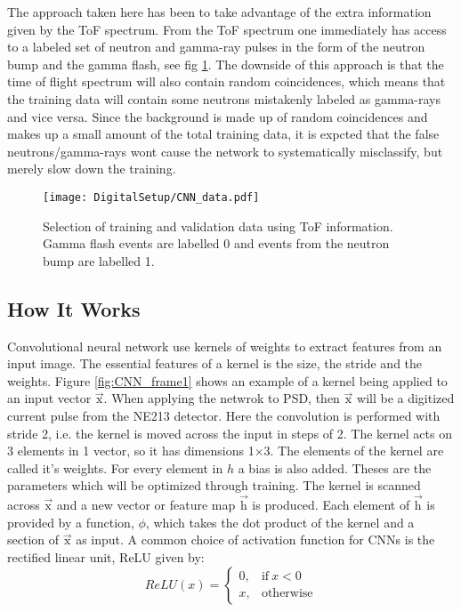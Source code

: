 \documentclass[main.tex]{subfiles}
\begin{document}
The approach taken here has been to take advantage of the extra information given by the ToF spectrum. From the ToF spectrum one immediately has access to a labeled set of neutron and gamma-ray pulses in the form of the neutron bump and the gamma flash, see fig \ref{fig:CNN_data}. The downside of this approach is that the time of flight spectrum will also contain random coincidences, which means that the training data will contain some neutrons mistakenly labeled as gamma-rays and vice versa. Since the background is made up of random coincidences and makes up a small amount of the total training data, it is expcted that the false neutrons/gamma-rays wont cause the network to systematically misclassify, but merely slow down the training.

\begin{figure}[ht!]
    \centering
        \texttt{[image: DigitalSetup/CNN\_data.pdf]}
        \caption[Selection of training and validation data]{Selection of training and validation data using ToF information. Gamma flash events are labelled 0 and events from the neutron bump are labelled 1.}
    \label{fig:CNN_data} 
\end{figure}

\subsection{How It Works}
Convolutional neural network use kernels of weights to extract features from an input image. The essential features of a kernel is the size, the stride and the weights. Figure \ref{fig:CNN_frame1} shows an example of a kernel being applied to an input vector $\vec{\textrm{x}}$. When applying the netwrok to PSD, then $\vec{\textrm{x}}$ will be a digitized current pulse from the NE213 detector. Here the convolution is performed with stride 2, i.e. the kernel is moved across the input in steps of 2. The kernel acts on 3 elements in 1 vector, so it has dimensions 1$\times$3. The elements of the kernel are called it's weights. For every element in $h$ a bias is also added. Theses are the parameters which will be optimized through training. The kernel is scanned across $\vec{\textrm{x}}$ and a new vector or feature map $\vec{\textrm{h}}$ is produced. Each element of $\vec{\textrm{h}}$ is provided by a function, $\phi$, which takes the dot product of the kernel and a section of $\vec{\textrm{x}}$ as input. A common choice of activation function for CNNs is the rectified linear unit, ReLU given by:
\begin{equation}
	ReLU(x) = 
	\begin{cases}
    	0, & \text{if}\ x<0 \\
    	x, & \text{otherwise}
    \end{cases}
\end{equation}
\end{document}
